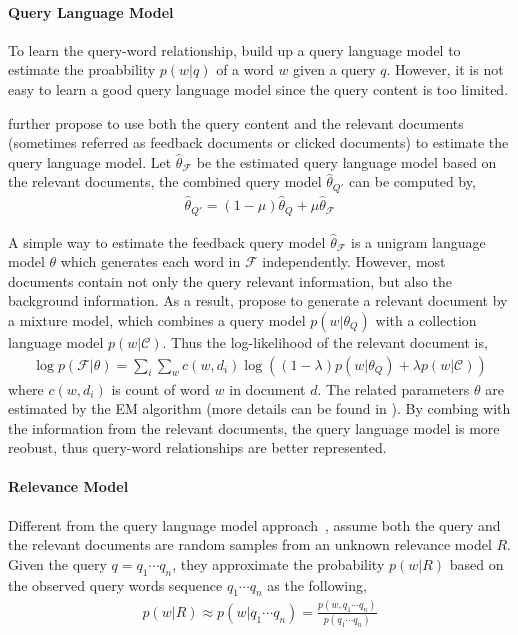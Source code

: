 \paragraph{Query Language Model}

To learn the query-word relationship, \cite{zhai-01b} build up a query language model to estimate the proabbility $p(w|q)$ of a word $w$ given a query $q$. However, it is not easy to learn a good query language model since the query content is too limited.

\cite{zhai-01b} further propose to use both the query content and the relevant documents (sometimes referred as feedback documents or clicked documents) to estimate the query language model. Let $\hat{\theta}_{\mathcal{F}}$ be the estimated query language model based on the relevant documents, the combined query model $\hat{\theta}_{Q'}$ can be computed by,
\begin{align}
\hat{\theta}_{Q'} = (1 - \mu)\hat{\theta}_{Q} + \mu \hat{\theta}_{\mathcal{F}}
\end{align}

A simple way to estimate the feedback query model $\hat{\theta}_{\mathcal{F}}$ is a unigram language model $\theta$ which generates each word in $\mathcal{F}$ independently. However, most documents contain not only the query relevant information, but also the background information. As a result, \cite{zhai-01b} propose to generate a relevant document by a mixture model, which combines a query model $p(w|\theta_Q)$ with a collection language model $p(w|\mathcal{C})$. Thus the log-likelihood of the relevant document is,
\begin{align}
\log p(\mathcal{F}|\theta) = \sum_i \sum_w c(w, d_i) \log((1-\lambda)p(w|\theta_Q) + \lambda p(w|\mathcal{C}))
\end{align}
where $c(w, d_i)$ is count of word $w$ in document $d$. The related parameters $\theta$ are estimated by the EM algorithm (more details can be found in \cite{zhai-01b}). By combing with the information from the relevant documents, the query language model is more reobust, thus query-word relationships are better represented.

\paragraph{Relevance Model}

Different from the query language model approach~\citep{zhai-01b}, \cite{Lavrenko-2001} assume both the query and the relevant documents are random samples from an unknown relevance model $R$. Given the query $q = q_1 \cdots q_n$, they approximate the probability $p(w|R)$ based on the observed query words sequence $q_1 \cdots q_n$ as the following,
\begin{align}
p(w|R) \approx p(w|q_1 \cdots q_n) = \frac{p(w,q_1 \cdots q_n)}{p(q_1 \cdots q_n)}
\end{align}

